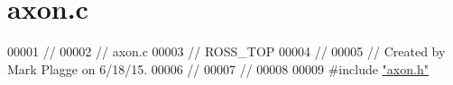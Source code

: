 \hypertarget{axon_8c_source}{}\section{axon.\+c}
\label{axon_8c_source}

\begin{DoxyCode}
00001 \textcolor{comment}{//}
00002 \textcolor{comment}{//  axon.c}
00003 \textcolor{comment}{//  ROSS\_TOP}
00004 \textcolor{comment}{//}
00005 \textcolor{comment}{//  Created by Mark Plagge on 6/18/15.}
00006 \textcolor{comment}{//}
00007 \textcolor{comment}{//}
00008 
00009 \textcolor{preprocessor}{#}\textcolor{preprocessor}{include} \hyperlink{axon_8h}{"axon.h"}
\end{DoxyCode}
